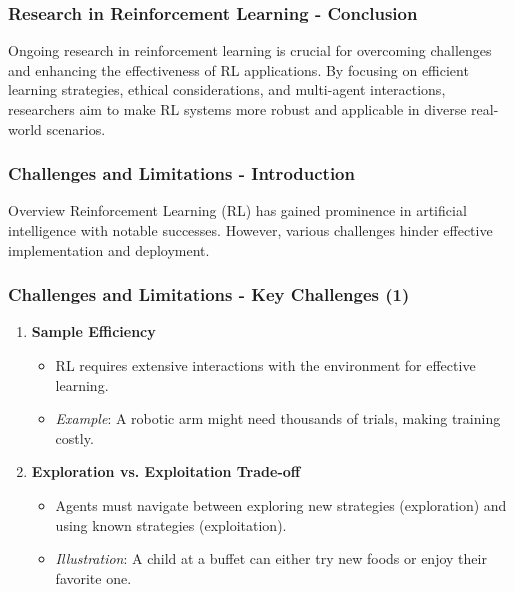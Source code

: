\documentclass[aspectratio=169]{beamer}
\begin{document}
\begin{frame}[fragile]
    \frametitle{Research in Reinforcement Learning - Conclusion}
    Ongoing research in reinforcement learning is crucial for overcoming challenges and enhancing the effectiveness of RL applications. By focusing on efficient learning strategies, ethical considerations, and multi-agent interactions, researchers aim to make RL systems more robust and applicable in diverse real-world scenarios.
\end{frame}

\begin{frame}[fragile]
  \frametitle{Challenges and Limitations - Introduction}
  \begin{block}{Overview}
    Reinforcement Learning (RL) has gained prominence in artificial intelligence with notable successes. 
    However, various challenges hinder effective implementation and deployment.
  \end{block}
\end{frame}

\begin{frame}[fragile]
  \frametitle{Challenges and Limitations - Key Challenges (1)}
  \begin{enumerate}
    \item \textbf{Sample Efficiency}
      \begin{itemize}
        \item RL requires extensive interactions with the environment for effective learning.
        \item \textit{Example}: A robotic arm might need thousands of trials, making training costly.
      \end{itemize}
    
    \item \textbf{Exploration vs. Exploitation Trade-off}
      \begin{itemize}
        \item Agents must navigate between exploring new strategies (exploration) and using known strategies (exploitation).
        \item \textit{Illustration}: A child at a buffet can either try new foods or enjoy their favorite one. 
      \end{itemize}
  \end{enumerate}
\end{frame}
\end{document}
